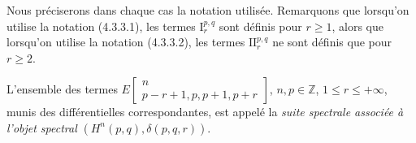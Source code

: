 Nous préciserons dans chaque cas la notation utilisée. Remarquons que
lorsqu'on utilise la notation (4.3.3.1), les termes $\mathrm I_r^{p,q}$ sont
définis pour $r\geq1$, alors que lorsqu'on utilise la notation (4.3.3.2),
les termes $\mathrm{II}_r^{p,q}$ ne sont définis que pour $r\geq2$.

L'ensemble des termes
$E\!\left[\begin{smallmatrix}n\\p-r+1,p,p+1,p+r\end{smallmatrix}\right]$,
$n,p\in\mathbb Z$, $1\leq r\leq+\infty$, munis des différentielles
correspondantes, est appelé la \emph{suite spectrale associée à l'objet
spectral} $(H^n(p,q),\delta(p,q,r))$.
\endgroup
